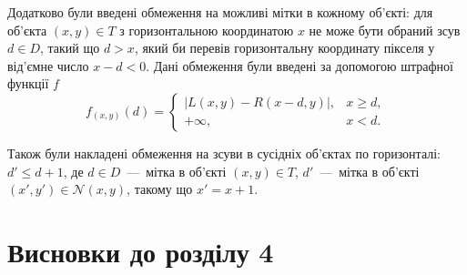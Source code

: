 
Додатково були введені обмеження на можливі мітки в кожному об'єкті:
для об'єкта $\left( x, y \right) \in T$ з горизонтальною координатою $x$
не може бути обраний зсув $d \in D$, такий що $d > x$,
який би перевів горизонтальну координату пікселя у від'ємне число $x - d < 0$.
Дані обмеження були введені за допомогою штрафної функції $f$
\begin{equation*}
    f_{\left(x, y \right)} \left( d \right) =
    \begin{cases}
        \left| L \left(x, y \right) - R \left(x - d, y \right) \right|,
            & x \ge d, \\
        + \infty, & x < d.
    \end{cases}
\end{equation*}


Також були накладені обмеження на зсуви в сусідніх об'єктах по горизонталі:
$d' \le d + 1$, де $d \in D$~---~мітка в об'єкті $\left(x, y \right) \in T$,
$d'$~---~мітка в об'єкті
$\left(x', y' \right) \in \mathcal{N} \left(x, y \right)$,
такому що $x' = x + 1$.



\section*{Висновки до розділу 4}

